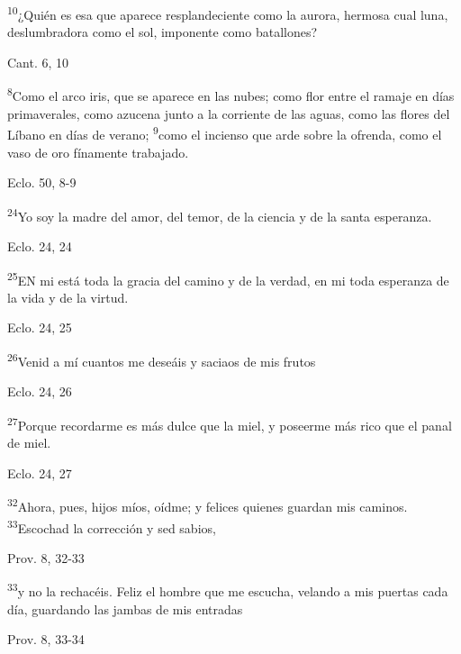 \documentclass[a4paper,11pt]{article}
\begin{document}
      \textsuperscript{10}¿Quién es esa que aparece resplandeciente como la aurora,
      hermosa cual luna, deslumbradora como el sol, imponente como batallones?
      \begin{flushright}
        Cant. 6, 10
      \end{flushright}

      \textsuperscript{8}Como el arco iris, que se aparece en las nubes; como flor entre el ramaje en días primaverales, como azucena junto
      a la corriente de las aguas, como las flores del Líbano en días de verano; \textsuperscript{9}como el incienso que arde sobre la ofrenda,
      como el vaso de oro fínamente trabajado.
      \begin{flushright}
        Eclo. 50, 8-9
      \end{flushright}

      \textsuperscript{24}Yo soy la madre del amor, del temor, de la ciencia y de la santa esperanza.
      \begin{flushright}
        Eclo. 24, 24
      \end{flushright}

      \textsuperscript{25}EN mi está toda la gracia del camino y de la verdad, en mi toda esperanza de la vida y de la virtud.
      \begin{flushright}
        Eclo. 24, 25
      \end{flushright}

      \textsuperscript{26}Venid a mí cuantos me deseáis y saciaos de mis frutos
      \begin{flushright}
        Eclo. 24, 26
      \end{flushright}

      \textsuperscript{27}Porque recordarme es más dulce que la miel, y poseerme más rico que el panal de miel.
      \begin{flushright}
        Eclo. 24, 27
      \end{flushright}

      \textsuperscript{32}Ahora, pues, hijos míos, oídme; y felices quienes guardan mis caminos. \textsuperscript{33}Escochad la corrección y sed sabios,
      \begin{flushright}
        Prov. 8, 32-33
      \end{flushright}

      \textsuperscript{33}y no la rechacéis. Feliz el hombre que me escucha, velando a mis puertas cada día,
      guardando las jambas de mis entradas
      \begin{flushright}
        Prov. 8, 33-34
      \end{flushright}
\end{document}
